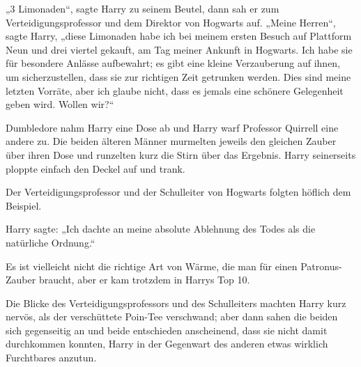 „3 Limonaden“, sagte Harry zu seinem Beutel, dann sah er zum Verteidigungsprofessor und dem Direktor von Hogwarts auf. „Meine Herren“, sagte Harry, „diese Limonaden habe ich bei meinem ersten Besuch auf Plattform Neun und drei viertel gekauft, am Tag meiner Ankunft in Hogwarts. Ich habe sie für besondere Anlässe aufbewahrt; es gibt eine kleine Verzauberung auf ihnen, um sicherzustellen, dass sie zur richtigen Zeit getrunken werden. Dies sind meine letzten Vorräte, aber ich glaube nicht, dass es jemals eine schönere Gelegenheit geben wird. Wollen wir?“

Dumbledore nahm Harry eine Dose ab und Harry warf Professor Quirrell eine andere zu. Die beiden älteren Männer murmelten jeweils den gleichen Zauber über ihren Dose und runzelten kurz die Stirn über das Ergebnis. Harry seinerseits ploppte einfach den Deckel auf und trank.

Der Verteidigungsprofessor und der Schulleiter von Hogwarts folgten höflich dem Beispiel.

Harry sagte: „Ich dachte an meine absolute Ablehnung des Todes als die natürliche Ordnung.“

Es ist vielleicht nicht die richtige Art von Wärme, die man für einen Patronus-Zauber braucht, aber er kam trotzdem in Harrys Top 10.

Die Blicke des Verteidigungsprofessors und des Schulleiters machten Harry kurz nervös, als der verschüttete Poin-Tee verschwand; aber dann sahen die beiden sich gegenseitig an und beide entschieden anscheinend, dass sie nicht damit durchkommen konnten, Harry in der Gegenwart des anderen etwas wirklich Furchtbares anzutun.

